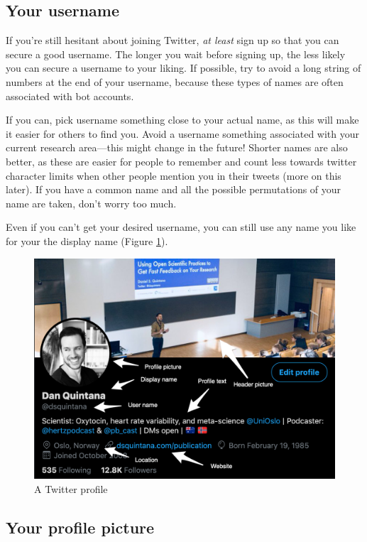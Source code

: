 \documentclass[]{book}
\begin{document}
\hypertarget{your-username}{%
\subsection{Your username}\label{your-username}}

If you're still hesitant about joining Twitter, \emph{at least} sign up so that you can secure a good username. The longer you wait before signing up, the less likely you can secure a username to your liking. If possible, try to avoid a long string of numbers at the end of your username, because these types of names are often associated with bot accounts.

If you can, pick username something close to your actual name, as this will make it easier for others to find you. Avoid a username something associated with your current research area---this might change in the future! Shorter names are also better, as these are easier for people to remember and count less towards twitter character limits when other people mention you in their tweets (more on this later). If you have a common name and all the possible permutations of your name are taken, don't worry too much.

Even if you can't get your desired username, you can still use any name you like for your the display name (Figure \ref{fig:profile}).

\begin{figure}

{\centering \includegraphics[width=0.8\linewidth]{images/profile} 

}

\caption{A Twitter profile}\label{fig:profile}
\end{figure}

\hypertarget{your-profile-picture}{%
\subsection{Your profile picture}\label{your-profile-picture}}
\end{document}
